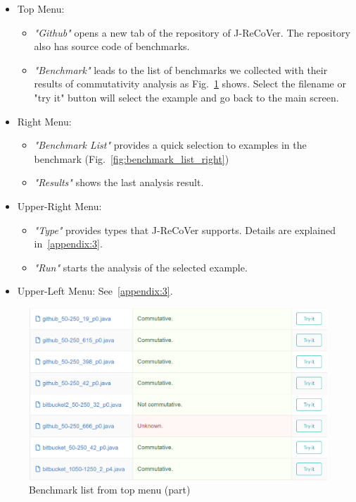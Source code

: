 \begin{itemize}
\item
Top Menu:
\begin{itemize}
\item
\emph{"Github"} opens a new tab of the repository of J-ReCoVer. The repository also has source code of benchmarks.
\item
\emph{"Benchmark"} leads to the list of benchmarks we collected with their results of commutativity analysis as Fig.~\ref{fig:benchmark_list} shows. Select the filename or "try it" button will select the example and go back to the main screen.
\end{itemize}
\item
Right Menu:
\begin{itemize}
\item
\emph{"Benchmark List"} provides a quick selection to examples in the benchmark (Fig.~\ref{fig:benchmark_list_right})
\item
\emph{"Results"} shows the last analysis result.
\end{itemize}
\item
Upper-Right Menu:
\begin{itemize}
\item
\emph{"Type"} provides types that J-ReCoVer supports. Details are explained in~\ref{appendix:3}.
\item
\emph{"Run"} starts the analysis of the selected example.
\end{itemize}
\item
Upper-Left Menu: See~\ref{appendix:3}.
\end{itemize}

\begin{figure}
\begin{center}
\includegraphics[width=.8\linewidth]{screenshots/benchmark_list.eps}
\caption{Benchmark list from top menu (part)}
\label{fig:benchmark_list}
\end{center}
\end{figure}


